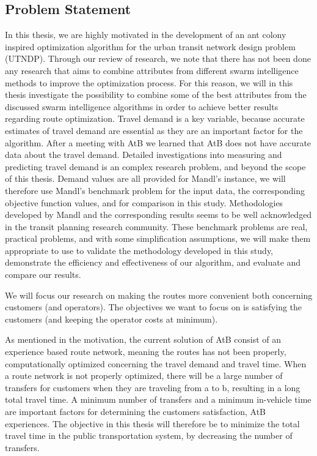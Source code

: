\subsection{Problem Statement}
In this thesis, we are highly motivated in the development of an ant colony inspired optimization algorithm for the urban transit network design problem (UTNDP). Through our review of research, we note that there has not been done any research that aims to combine attributes from different swarm intelligence methods to improve the optimization process. For this reason, we will in this thesis investigate the possibility to combine some of the best attributes from the discussed swarm intelligence algorithms in order to achieve better results regarding route optimization. Travel demand is a key variable, because accurate estimates of travel demand are essential as they are an important factor for the algorithm. After a meeting with AtB we learned that AtB does not have accurate data about the travel demand. Detailed investigations into measuring and predicting travel demand is an complex research problem, and beyond the scope of this thesis. Demand values are all provided for Mandl's instance, we will therefore use Mandl's benchmark problem \citep{mandl79} for the input data, the corresponding objective function values, and for comparison in this study. Methodologies developed by Mandl and the corresponding results seems to be well acknowledged in the transit planning research community. These benchmark problems are real, practical problems, and with some simplification assumptions, we will make them appropriate to use to validate the methodology developed in this study, demonstrate the efficiency and effectiveness of our algorithm, and evaluate and compare our results. 

We will focus our research on making the routes more convenient both concerning customers (and operators). The objectives we want to focus on is satisfying the customers (and keeping the operator costs at minimum). 

As mentioned in the motivation, %
the current solution of AtB consist of an experience based route network, meaning the routes has not been properly, computationally optimized concerning the travel demand and travel time. When a route network is not properly optimized, there will be a large number of transfers for customers when they are traveling from a to b, resulting in a long total travel time. A minimum number of transfers and a minimum in-vehicle time are important factors for determining the customers satisfaction, AtB experiences. The objective in this thesis will therefore be to minimize the total travel time in the public transportation system, by decreasing the number of transfers. 

